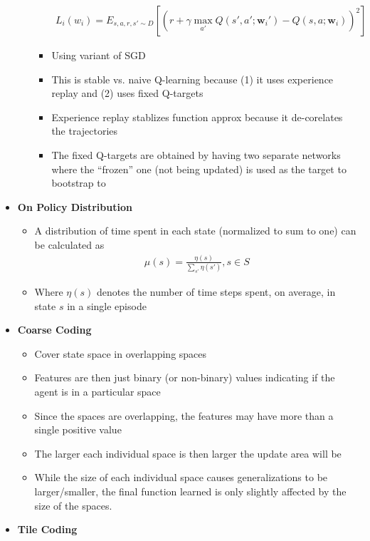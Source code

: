 \documentclass[12pt]{article}
\begin{document}
\begin{itemize}
\begin{itemize}
\begin{itemize}
\begin{gather*}
          L_i(w_i) = E_{s, a, r, s' \sim D}[(r + \gamma \max\limits_{a'}Q(s', a'; \textbf{w}_i') - Q(s, a; \textbf{w}_i))^2]
        \end{gather*}
        \item Using variant of SGD
        \item This is stable vs. naive Q-learning because (1) it uses experience replay and (2) uses fixed Q-targets
        \item Experience replay stablizes function approx because it de-corelates the trajectories
        \item The fixed Q-targets are obtained by having two separate networks where the ``frozen'' one (not being updated) is used as the target to bootstrap to
      \end{itemize}
    \end{itemize}
    \item \textbf{On Policy Distribution}
    \begin{itemize}
      \item A distribution of time spent in each state (normalized to sum to one) can be calculated as
      \begin{gather*}
        \mu(s) = \frac{\eta(s)}{\sum_{s'}\eta(s')}, s \in S
      \end{gather*}
      \item Where $\eta(s)$ denotes the number of time steps spent, on average, in state $s$ in a single episode
    \end{itemize}
    \item \textbf{Coarse Coding}
    \begin{itemize}
      \item Cover state space in overlapping spaces
      \item Features are then just binary (or non-binary) values indicating if the agent is in a particular space
      \item Since the spaces are overlapping, the features may have more than a single positive value
      \item The larger each individual space is then larger the update area will be
      \item While the size of each individual space causes generalizations to be larger/smaller,
      the final function learned is only slightly affected by the size of the spaces.
    \end{itemize}
    \item \textbf{Tile Coding}
    \begin{itemize}

\end{itemize}
\end{itemize}
\end{document}
